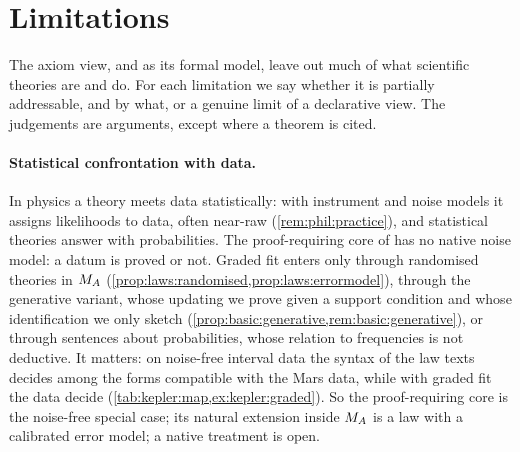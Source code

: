 \section{Limitations}\label{sec:limits}

The axiom view, and \SAIabbr as its formal model, leave out much of what scientific theories are and do. For each limitation we say whether it is partially addressable, and by what, or a genuine limit of a declarative view. The judgements are arguments, except where a theorem is cited.

\paragraph{Statistical confrontation with data.}\label{sec:limits:stat}In physics a theory meets data statistically: with instrument and noise models it assigns likelihoods to data, often near-raw (\cref{rem:phil:practice}), and statistical theories answer with probabilities. The proof-requiring core of \SAIabbr has no native noise model: a datum is proved or not. Graded fit enters only through randomised theories in $M_{A}$ (\cref{prop:laws:randomised,prop:laws:errormodel}), through the generative variant, whose updating we prove given a support condition and whose identification we only sketch (\cref{prop:basic:generative,rem:basic:generative}), or through sentences about probabilities, whose relation to frequencies is not deductive. It matters: on noise-free interval data the syntax of the law texts decides among the forms compatible with the Mars data, while with graded fit the data decide (\cref{tab:kepler:map,ex:kepler:graded}). So the proof-requiring core is the noise-free special case; its natural extension inside $M_{A}$ is a law with a calibrated error model; a native treatment is open.

